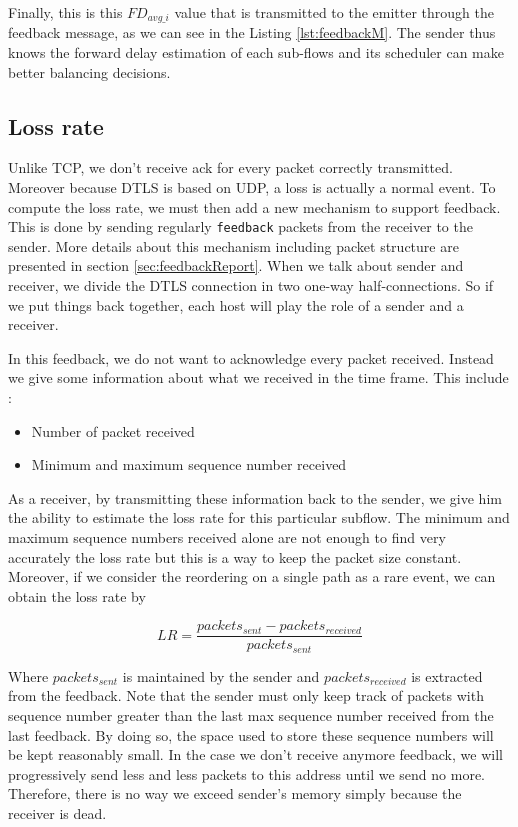 Finally, this is this $FD_{avg\_i}$ value that is transmitted to the emitter through the feedback message, as we can see in the Listing \ref{lst:feedbackM}. The sender thus knows the forward delay estimation of each sub-flows and its scheduler can make better balancing decisions.

\subsection{Loss rate}

Unlike TCP, we don't receive ack for every packet correctly transmitted. Moreover because DTLS is based on UDP, a loss is actually a normal event. To compute the loss rate, we must then add a new mechanism to support feedback. This is done by sending regularly \verb!feedback! packets from the receiver to the sender. More details about this mechanism including packet structure are presented in section \ref{sec:feedbackReport}. When we talk about sender and receiver, we divide the DTLS connection in two one-way half-connections. So if we put things back together, each host will play the role of a sender and a receiver.

In this feedback, we do not want to acknowledge every packet received. Instead we give some information about what we received in the time frame. This include : 

\begin{itemize}
\item Number of packet received
\item Minimum and maximum sequence number received
\end{itemize}

As a receiver, by transmitting these information back to the sender, we give him the ability to estimate the loss rate for this particular subflow. The minimum and maximum sequence numbers received alone are not enough to find very accurately the loss rate but this is a way to keep the packet size constant. Moreover, if we consider the reordering on a single path as a rare event, we can obtain the loss rate by 

\begin{equation*}
LR = \frac{packets_{sent} - packets_{received}}{packets_{sent}}
\end{equation*}

Where $packets_{sent}$ is maintained by the sender and $packets_{received}$ is extracted from the feedback. Note that the sender must only keep track of packets with sequence number greater than the last max sequence number received from the last feedback. By doing so, the space used to store these sequence numbers will be kept reasonably small. In the case we don't receive anymore feedback, we will progressively send less and less packets to this address until we send no more. Therefore, there is no way we exceed sender's memory simply because the receiver is dead.


